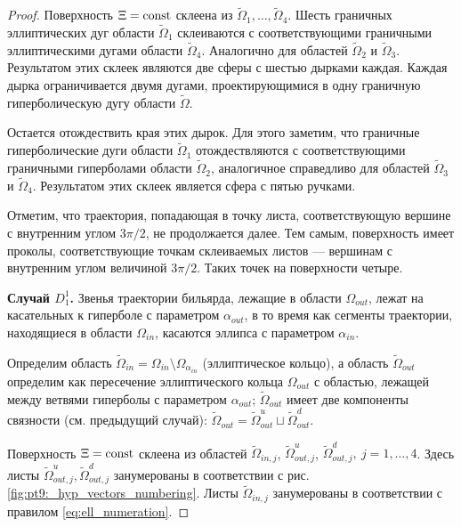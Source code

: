 \begin{proof}
Поверхность $\Xi=\mathrm{const}$ склеена из $\widetilde{\Omega}_1, \ldots, \widetilde{\Omega}_4$.
Шесть граничных эллиптических дуг области $\widetilde{\Omega}_1$ склеиваются с соответствующими граничными эллиптическими дугами области $\widetilde{\Omega}_4$. Аналогично для областей $\widetilde{\Omega}_2$ и $\widetilde{\Omega}_3$.
Результатом этих склеек являются две сферы с шестью дырками каждая.
Каждая дырка ограничивается двумя дугами, проектирующимися в одну граничную гиперболическую дугу области $\widetilde{\Omega}$.

Остается отождествить края этих дырок. Для этого заметим, что граничные гиперболические дуги области $\widetilde{\Omega}_1$ отождествляются с соответствующими граничными гиперболами области $\widetilde{\Omega}_2$, аналогичное справедливо для областей $\widetilde{\Omega}_3$ и $\widetilde{\Omega}_4$. Результатом этих склеек является сфера с пятью ручками. 

Отметим, что траектория, попадающая в точку листа, соответствующую вершине с внутренним углом $3\pi / 2$, не продолжается далее. %
Тем самым, поверхность имеет проколы, соответствующие точкам склеиваемых листов --- вершинам с внутренним углом величиной $3\pi / 2$. 
Таких точек на поверхности четыре. %

\medskip
\textbf{Случай $D_1^1$.}
Звенья траектории бильярда, лежащие в области $\Omega_{out}$, лежат на касательных к гиперболе с параметром $\alpha_{out}$, в то время как сегменты траектории, находящиеся в области $\Omega_{in}$, касаются эллипса с параметром $\alpha_{in}$. 

Определим область $\widetilde{\Omega}_{in} = \Omega_{in} \setminus \Omega_{\alpha_{in}}$ (эллиптическое кольцо), а область $\widetilde{\Omega}_{out}$ определим как пересечение эллиптического кольца $\Omega_{out}$ с областью, лежащей между ветвями гиперболы с параметром $\alpha_{out}$; $\widetilde{\Omega}_{out}$ имеет две компоненты связности
(см.  предыдущий случай): $\widetilde{\Omega}_{out} = \widetilde{\Omega}_{out}^u \sqcup \widetilde{\Omega}_{out}^d$.

Поверхность $\Xi = \mathrm{const}$ склеена из областей 
$\widetilde{\Omega}_{in, j}$, $\widetilde{\Omega}_{out, j}^u$,  $\widetilde{\Omega}_{out, j}^d, \ j=1, \ldots, 4$. Здесь листы  $\widetilde{\Omega}_{out, j}^u, \widetilde{\Omega}_{out, j}^d$ занумерованы в соответствии с рис. \ref{fig:pt9:_hyp_vectors_numbering}. Листы $\widetilde{\Omega}_{in, j}$ занумерованы в соответствии с правилом  \eqref{eq:ell_numeration}.


\end{proof}
